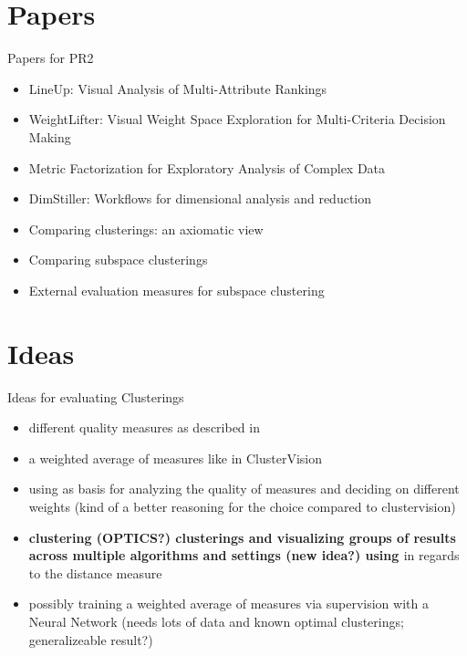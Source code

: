 \documentclass{beamer}
\begin{document}
\section{Papers}

\begin{frame}{Papers for PR2}

\begin{itemize}
  \item LineUp: Visual Analysis of Multi-Attribute Rankings \cite{2013_infovis_lineup}
  \item WeightLifter: Visual Weight Space Exploration for Multi-Criteria Decision Making \cite{cs4804}
  \item Metric Factorization for Exploratory Analysis of Complex Data \cite{7023368}
  \item DimStiller: Workflows for dimensional analysis and reduction \cite{cs4209}
  \item Comparing clusterings: an axiomatic view \cite{Meila05comparingclusterings:}
  \item Comparing subspace clusterings \cite{1637417}
  \item External evaluation measures for subspace clustering \cite{Gunnemann:2011:EEM:2063576.2063774}
\end{itemize}

\end{frame}

\section{Ideas}

\begin{frame}{Ideas for evaluating Clusterings}
\begin{itemize}
\item different quality measures as described in \cite{Gunnemann:2011:EEM:2063576.2063774}
\item a weighted average of measures like in ClusterVision\cite{8019866}
\item using \cite{2013_infovis_lineup,cs4804,7023368} as basis for analyzing the quality of measures and deciding on different weights (kind of a better reasoning for the choice compared to clustervision)
\item \textbf{clustering (OPTICS?) clusterings and visualizing groups of results across multiple algorithms and settings (new idea?) using \cite{Meila05comparingclusterings:,1637417}} in regards to the distance measure
\item possibly training a weighted average of measures via supervision with a Neural Network (needs lots of data and known optimal clusterings; generalizeable result?)

\end{itemize}
\end{frame}
\end{document}
